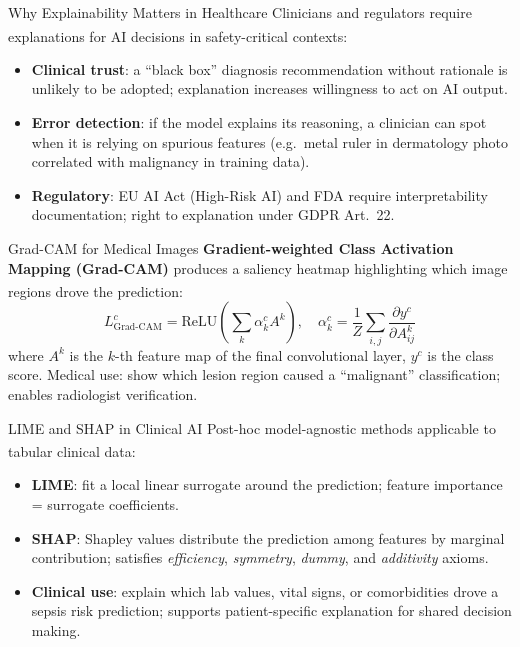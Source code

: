 \begin{v3topic}{Why Explainability Matters in Healthcare}
    Clinicians and regulators require explanations for AI decisions in safety-critical contexts\textsuperscript{\cite[][pp.~1--10]{molnarInterpretableMachineLearning2019}}:
    \begin{itemize}
        \item \textbf{Clinical trust}: a ``black box'' diagnosis recommendation without rationale is unlikely to be adopted; explanation increases willingness to act on AI output.
        \item \textbf{Error detection}: if the model explains its reasoning, a clinician can spot when it is relying on spurious features (e.g.\ metal ruler in dermatology photo correlated with malignancy in training data).
        \item \textbf{Regulatory}: EU AI Act (High-Risk AI) and FDA require interpretability documentation; right to explanation under GDPR Art.~22.
    \end{itemize}

\end{v3topic}
\begin{v3topic}{{Grad-CAM for Medical Images}}
    \textbf{Gradient-weighted Class Activation Mapping (Grad-CAM)} produces a saliency heatmap highlighting which image regions drove the prediction\textsuperscript{\cite[][p.~619]{selvarajuGradCAMVisualExplanations2017}}:
    \begin{equation}
        L^c_{\text{Grad-CAM}} = \text{ReLU}\!\left(\sum_k \alpha_k^c A^k\right), \quad
        \alpha_k^c = \frac{1}{Z}\sum_{i,j} \frac{\partial y^c}{\partial A^k_{ij}}
    \end{equation}
    where $A^k$ is the $k$-th feature map of the final convolutional layer, $y^c$ is the class score.
    Medical use: show which lesion region caused a ``malignant'' classification; enables radiologist verification.

\end{v3topic}
\begin{v3topic}{{LIME and SHAP in Clinical AI}}
    Post-hoc model-agnostic methods applicable to tabular clinical data\textsuperscript{\cite[][pp.~85--110]{molnarInterpretableMachineLearning2019}}:
    \begin{itemize}
        \item \textbf{LIME}: fit a local linear surrogate around the prediction; feature importance = surrogate coefficients.
        \item \textbf{SHAP}: Shapley values distribute the prediction among features by marginal contribution; satisfies \textit{efficiency}, \textit{symmetry}, \textit{dummy}, and \textit{additivity} axioms.
        \item \textbf{Clinical use}: explain which lab values, vital signs, or comorbidities drove a sepsis risk prediction; supports patient-specific explanation for shared decision making.
    \end{itemize}

\end{v3topic}
